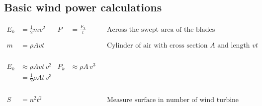 \documentclass[12pt]{article}
\begin{document}
\subsection{Basic wind power calculations}
\begin{align*}
	E_k           & = \frac{1}{2}mv^2                       &
	P             & = \frac{E_k}{t}
	              &                                         & \text{Across the swept area of the blades} & \phantom{=}                                                                           \\
	\phantom{=}                                                                                                                                                                                  \\
	m             & = \rho Avt                              &                                            &              &  & \text{Cylinder of air with cross section } A \text{ and length } vt \\
	\phantom{=}                                                                                                                                                                                  \\
	\phantom{=}                                                                                                                                                                                  \\
	E_k           & \approx \rho Avt \, v^2
	              & P_k                                     & \approx \rho A \, v^3                                                                                                              \\
	              & = \frac{1}{2} \rho At \, v^3                                                                                                                                                 \\
	\phantom{=}                                                                                                                                                                                  \\
	\phantom{=}                                                                                                                                                                                  \\
	S             & = n^2 t^2                               &                                            &              &  & \text{Measure surface in number of wind turbine radii}              \\

\end{align*}
\end{document}
